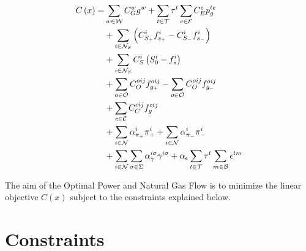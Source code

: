 
\begin{equation}
\begin{aligned}
C \left( x \right) = & \sum_{w \in \cal{W}}{C^{w}_{G} g^{w}} + \sum_{t \in \cal{T}} {\tau}^{t}  \sum_{e \in \cal{E}} {C^{e}_{E} p_{g}^{te}}\\ 
				& + \sum_{i \in {\cal{N}}_{S}}{\left({C^{i}_{S_+} f^{i}_{s_+}} - {C^{i}_{S_-} f^{i}_{s_-}}  \right)}\\
				& + \sum_{i \in {\cal{N}}_{S}}{C^{i}_{S} \left( S^{i}_{0} - f^{i}_{s} \right)} \\
				& + \sum_{o \in \cal{O}}{C^{oij}_{O} f^{oij}_{g_+}} - \sum_{o \in \cal{O}}{C^{oij}_{O} f^{oij}_{g_-}} \\
				& + \sum_{c \in \cal{C}}{C^{cij}_{C} f^{cij}_{g}} \\ 
				& + \sum_{i \in \cal{N}}{\alpha^{i}_{\pi_+} \pi^{i}_{+}} + \sum_{i \in \cal{N}}{ \alpha^{i}_{\pi_-} \pi^{i}_{-}} \\
				& + \sum_{i \in \cal{N}}\sum_{\sigma \in \Sigma} {\alpha_{\gamma}^{i \sigma}\gamma^{i \sigma}} + \alpha_{\epsilon} \sum_{t \in \cal{T}} {\tau}^{t} \sum_{m \in \cal{B}} {\epsilon^{tm}}  
\end{aligned}
\label{eq:obj_func}
\vspace{0.3cm}
\end{equation}

The aim of the Optimal Power and Natural Gas Flow is to minimize the linear objective $C(x)$ subject to the constraints explained below.

\section{Constraints}

